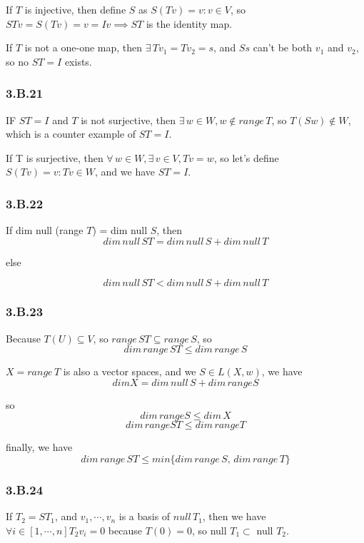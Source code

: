 If $T$ is injective, then define $S$ as $S(Tv) = v:v\in V$, so $STv = S(Tv) = v = Iv \implies ST$ is the identity map.

If $T$ is not a one-one map, then $\exists\, Tv_{1} = Tv_{2} = s$, and $Ss$ can't be both $v_{1}$ and $v_{2}$, so no $ST = I$ exists.

\subsubsection*{3.B.21}

IF $ST = I$ and $T$ is not surjective, then $\exists\,w \in W, w\notin range\,T$, so $T(Sw)\notin W$, which is a counter example of $ST = I$.

If T is surjective, then $\forall\,w \in W, \exists\,v\in V, Tv = w$, so let's define $S(Tv) = v: Tv\in W$, and we have $ST = I$.

\subsubsection*{3.B.22}

If dim null (range $T$) = dim null $S$, then 
\[dim\, null\, ST = dim\, null\, S + dim\,null\,T\]

else 

\[dim\, null\, ST < dim\, null\, S + dim\,null\,T\]

\subsubsection*{3.B.23}

Because $T(U) \subseteq V$, so $range\,ST\subseteq range\,S$, so 
\[dim\,range\,ST\leq dim\,range\,S\]

$X = range\, T$ is also a vector spaces, and we $S\in L(X, w)$, we have 
\[dim X = dim\, null\,S + dim\,range S\]

so 
\[dim\,range S \leq dim\,X\]
\[dim\,range ST \leq dim\,range T\]

finally, we have
\[dim\,range\,ST\leq min\{dim\,range\,S,\, dim\,range\,T\}\]

\subsubsection*{3.B.24}

If $T_{2} = ST_{1}$, and $v_{1},\cdots,v_{n}$ is a basis of $null\, T_{1}$, then we have $\forall i \in [1,\cdots,n] T_{2}v_{i}=0$ because $T(0) = 0$, so
    null $T_{1}\subset$ null $ T_{2}$.
    
